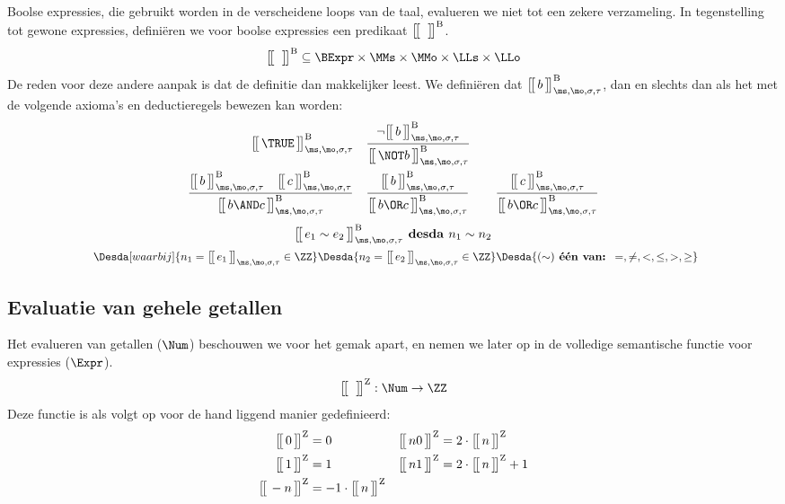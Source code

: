 Boolse expressies, die gebruikt worden in de verscheidene loops van de taal, evalueren we niet tot een zekere verzameling. In tegenstelling tot gewone expressies, definiëren we voor boolse expressies een predikaat $\Express[B]{\;}{}$.
%
\begin{equation*}
  \Express[B]{\;}{} \subseteq \BExpr \times \MMs \times \MMo \times \LLs \times \LLo
\end{equation*}
%
De reden voor deze andere aanpak is dat de definitie dan makkelijker leest. We definiëren dat $\Express[B]{b}{\ms,\mo,\sigma,\tau}$, dan en slechts dan als het met de volgende axioma's en deductieregels bewezen kan worden:
%
\begin{align*}
  \Express[B]{\TRUE}{\ms,\mo,\sigma,\tau} & & &
  \frac
    {\neg \Express[B]{b}{\ms,\mo,\sigma,\tau}}
    {\Express[B]{\NOT b}{\ms,\mo,\sigma,\tau}} \\
  \frac
    {\Express[B]{b}{\ms,\mo,\sigma,\tau} \quad \Express[B]{c}{\ms,\mo,\sigma,\tau}}
    {\Express[B]{b \AND c}{\ms,\mo,\sigma,\tau}} & & &
  \frac
    {\Express[B]{b}{\ms,\mo,\sigma,\tau}}
    {\Express[B]{b \OR c}{\ms,\mo,\sigma,\tau}} & & &
  \frac
    {\Express[B]{c}{\ms,\mo,\sigma,\tau}}
    {\Express[B]{b \OR c}{\ms,\mo,\sigma,\tau}}
\end{align*}
\begin{gather*}
  \Express[B]{e_1 \sim e_2}{\ms,\mo,\sigma,\tau} \textbf{ desda } n_1 \sim n_2 \\
  \Desdas{
    \Desda[waarbij]{n_1 = \Express{e_1}{\ms,\mo,\sigma,\tau} \in \ZZ}
    \Desda{n_2 = \Express{e_2}{\ms,\mo,\sigma,\tau} \in \ZZ}
    \Desda{(\sim) \textbf{ één van: } =, \neq, <, \le, >, \ge}
  }
\end{gather*}

\subsection{Evaluatie van gehele getallen}

Het evalueren van getallen ($\Num$) beschouwen we voor het gemak apart, en nemen we later op in de volledige semantische functie voor expressies ($\Expr$).
%
\begin{equation*}
  \Express[Z]{\;}{} : \Num \to \ZZ \\
\end{equation*}
%
Deze functie is als volgt op voor de hand liggend manier gedefinieerd:
%
\begin{align*}
  \Express[Z]{0}{} &= 0 &
  \Express[Z]{n 0}{} &= 2 \cdot \Express[Z]{n}{} \\
  \Express[Z]{1}{} &= 1 &
  \Express[Z]{n 1}{} &= 2 \cdot \Express[Z]{n}{} + 1 \\
  \Express[Z]{-n}{} &= -1 \cdot \Express[Z]{n}{}
\end{align*}

